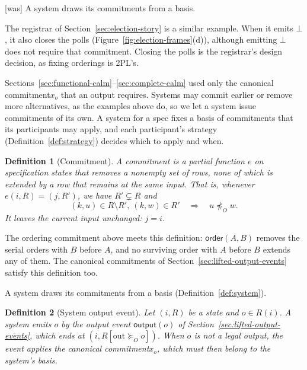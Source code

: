 \documentclass[sigconf]{cidr-2027}
\newtheorem{definition}{Definition}
\theoremstyle{remark}
\newcommand{\OutputOrd}{\preceq_O}
\newcommand{\OutputGe}{\succeq_O}
\newcommand{\commitment}{commitment\xspace}
\newcommand{\commitments}{commitments\xspace}
\newcommand{\Commitment}{Commitment\xspace}
\newcommand{\outrel}{extends\xspace}          %
\newcommand{\outrelpast}{extended\xspace}     %
\begin{document}
{\footnotesize\color{black!50}\noindent\textsf{[was]} A system draws its \commitments from a basis.\par}

\color{blue!70!black}The registrar of Section~\ref{sec:election-story} is a similar example.  When
it emits $\bot$, it also closes the polls (Figure~\ref{fig:election-frames}(d)),
although emitting $\bot$ does not require that \commitment.  Closing the polls is the registrar's
design decision, as fixing orderings is 2PL's.\color{black}

\color{blue!70!black}Sections~\ref{sec:functional-calm}--\ref{sec:complete-calm} used only the
canonical \commitment $x_o$ that an output requires.  Systems may commit
earlier or remove more alternatives, as the examples above do, so we let a
system issue \commitments of its own.  A system for a spec fixes a basis of
\commitments that its participants may apply, and each participant's strategy
(Definition~\ref{def:strategy}) decides which to apply and when.\color{black}

\color{blue!70!black}\begin{definition}[\Commitment]
\label{def:commitment}
A \emph{\commitment} is a partial function $e$ on specification states that
removes a nonempty set of rows, none of which is \outrelpast by a row that
remains at the same input.  That is, whenever $e(i,R)=(j,R')$, we have
$R'\subsetneq R$ and
\begin{equation}
  (k,u)\in R\setminus R',\ (k,w)\in R'
  \quad\Longrightarrow\quad
  u\not\OutputOrd w.
  \label{eq:commitment-unsubsumed}
\end{equation}
It leaves the current input unchanged: $j=i$.\color{black}
\end{definition}

\color{blue!70!black}The ordering \commitment above meets this definition: $\mathsf{order}(A,B)$ removes the
serial orders with $B$ before $A$, and no surviving order with $A$ before $B$
\outrel any of them.  The canonical \commitments of
Section~\ref{sec:lifted-output-events} satisfy this definition too.\color{black}

\color{blue!70!black}A system draws its \commitments from a basis (Definition~\ref{def:system}).\color{black}

\begin{definition}[System output event]
\label{def:system-output-event}
Let $(i,R)$ be a state and $o\in R(i)$.  A system emits $o$ by the output
event $\mathsf{output}(o)$ of Section~\ref{sec:lifted-output-events}, which
ends at $(i,R[\mathrm{out}\OutputGe o])$.  When $o$ is not a legal output,
the event applies the canonical \commitment $x_o$, which must then belong to
the system's basis.
\end{definition}
\end{document}
